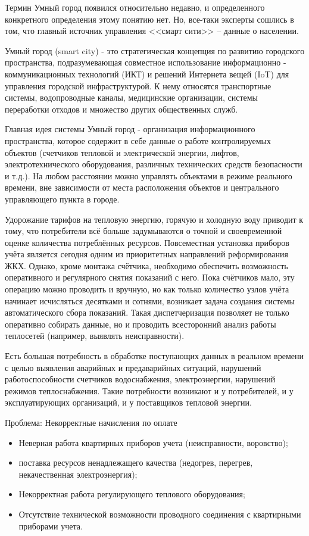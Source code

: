 
Термин Умный город появился относительно недавно, и определенного конкретного определения этому понятию нет. Но, все-таки  эксперты сошлись в том, что главный источник управления <<смарт сити>> – данные о населении. 

Умный город (smart city) - это стратегическая концепция по развитию городского пространства, подразумевающая совместное использование информационно - коммуникационных технологий (ИКТ) и решений Интернета вещей (IoT) для управления городской инфраструктурой. К нему относятся транспортные системы, водопроводные каналы, медицинские организации, системы переработки отходов и множество других общественных служб. \cite{Harrison}

Главная идея системы Умный город - организация информационного пространства, которое содержит в себе данные о работе контролируемых объектов (счетчиков тепловой и электрической энергии, лифтов, электротехнического оборудования, различных технических средств безопасности и т.д.). На любом расстоянии можно управлять объектами в режиме реального времени, вне зависимости от места расположения объектов и центрального управляющего пункта в городе.

Удорожание тарифов на тепловую энергию, горячую и холодную воду приводит к тому, что потребители всё больше задумываются о точной и своевременной оценке количества потреблённых ресурсов. Повсеместная установка приборов учёта является сегодня одним из приоритетных направлений реформирования ЖКХ. Однако, кроме монтажа счётчика, необходимо обеспечить возможность оперативного и регулярного снятия показаний с него. Пока счётчиков мало, эту операцию можно проводить и вручную, но как только количество узлов учёта начинает исчисляться десятками и сотнями, возникает задача создания системы автоматического сбора показаний. Такая диспетчеризация позволяет не только оперативно собирать данные, но и проводить всесторонний анализ работы теплосетей (например, выявлять неисправности).

Есть большая потребность в обработке поступающих данных в реальном времени с целью выявления аварийных и предаварийных ситуаций, нарушений работоспособности счетчиков водоснабжения, электроэнергии, нарушений режимов теплоснабжения. Такие потребности возникают и у потребителей, и у эксплуатирующих организаций, и у поставщиков тепловой энергии.

Проблема: Некорректные начисления по оплате \cite{Almanah}
\begin{itemize}
	\item Неверная работа квартирных приборов учета (неисправности, воровство); 
	\item поставка ресурсов ненадлежащего качества (недогрев, перегрев, некачественная электроэнергия);
	\item Некорректная работа регулирующего теплового оборудования; 
	\item Отсутствие технической возможности проводного соединения с квартирными приборами учета.
\end{itemize}

